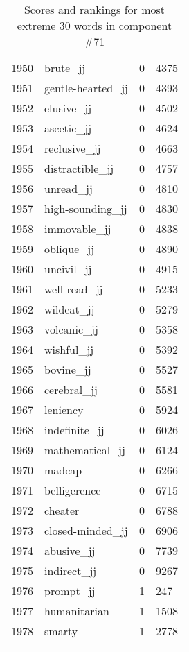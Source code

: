 \begin{longtable}[!htbp]{| rlr@{.}l |}
    1950 & brute\_jj & 0 & 4375 \\
    1951 & gentle-hearted\_jj & 0 & 4393 \\
    1952 & elusive\_jj & 0 & 4502 \\
    1953 & ascetic\_jj & 0 & 4624 \\
    1954 & reclusive\_jj & 0 & 4663 \\
    1955 & distractible\_jj & 0 & 4757 \\
    1956 & unread\_jj & 0 & 4810 \\
    1957 & high-sounding\_jj & 0 & 4830 \\
    1958 & immovable\_jj & 0 & 4838 \\
    1959 & oblique\_jj & 0 & 4890 \\
    1960 & uncivil\_jj & 0 & 4915 \\
    1961 & well-read\_jj & 0 & 5233 \\
    1962 & wildcat\_jj & 0 & 5279 \\
    1963 & volcanic\_jj & 0 & 5358 \\
    1964 & wishful\_jj & 0 & 5392 \\
    1965 & bovine\_jj & 0 & 5527 \\
    1966 & cerebral\_jj & 0 & 5581 \\
    1967 & leniency & 0 & 5924 \\
    1968 & indefinite\_jj & 0 & 6026 \\
    1969 & mathematical\_jj & 0 & 6124 \\
    1970 & madcap & 0 & 6266 \\
    1971 & belligerence & 0 & 6715 \\
    1972 & cheater & 0 & 6788 \\
    1973 & closed-minded\_jj & 0 & 6906 \\
    1974 & abusive\_jj & 0 & 7739 \\
    1975 & indirect\_jj & 0 & 9267 \\
    1976 & prompt\_jj & 1 & 247 \\
    1977 & humanitarian & 1 & 1508 \\
    1978 & smarty & 1 & 2778 \\
    \hline
    \caption{Scores and rankings for most extreme 30 words in component \#71} \\
\end{longtable}
